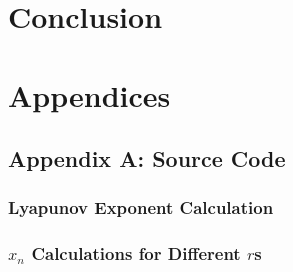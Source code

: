 \documentclass[a4paper]{article}
\begin{document}
\section{Conclusion}
\qq 

\section{Appendices}

\subsection{Appendix A: Source Code}

\subsubsection{Lyapunov Exponent Calculation}
\label{cod:lyapunov}

\subsubsection{\( x_n \) Calculations for Different \( r \)s}
\label{cod:xnVr}
\end{document}
